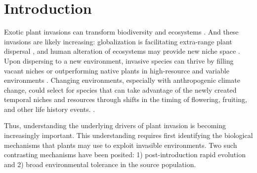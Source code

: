 \documentclass[12pt]{article}\usepackage[]{graphicx}\usepackage[]{color}
\begin{document}
	\section{Introduction} 
	Exotic plant invasions  can transform biodiversity and ecosystems \parencite{Bellard2016, Pejchar2009,Mack2000}.%
And these invasions are likely increasing: globalization is facilitating extra-range plant dispersal \parencite{Helmus2014}, and human alteration of ecosystems may provide new niche space \parencite{Tilman2001, Blois2013,Inouye2008,Harte2015}. Upon dispersing to a new environment, invasive species can thrive by filling vacant niches \parencite{Elton1958} or outperforming native plants in high-resource and variable environments \parencite{Davis2001,Daehler2003}. Changing environments, especially with anthropogenic climate change, could select for species that can take advantage of the newly created temporal niches and resources through shifts in the timing of flowering, fruiting, and other life history events. \parencite{Franks2007}. 
	
	Thus, understanding the underlying drivers of plant invasion is becoming increasingly important. This understanding requires first identifying the biological mechanisms that plants may use to exploit invasible environments. Two such contrasting mechanisms have been posited: 1) post-introduction rapid evolution and 2) broad environmental tolerance in the source population. 
\end{document}
